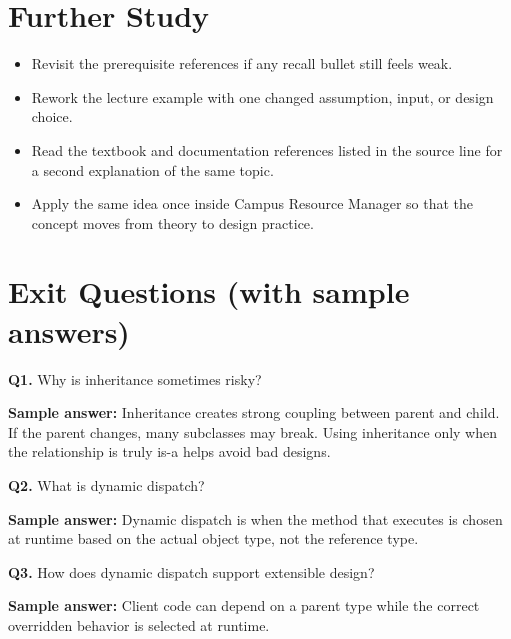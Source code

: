 \documentclass[11pt]{article}
\begin{document}
\section{Further Study}
\begin{itemize}
  \item Revisit the prerequisite references if any recall bullet still feels weak.
  \item Rework the lecture example with one changed assumption, input, or design choice.
  \item Read the textbook and documentation references listed in the source line for a second explanation of the same topic.
  \item Apply the same idea once inside Campus Resource Manager so that the concept moves from theory to design practice.
\end{itemize}
\notesources{\OOPSUnitIISources}

\section{Exit Questions (with sample answers)}
\textbf{Q1.} Why is inheritance sometimes risky?\par
\textbf{Sample answer:} Inheritance creates strong coupling between parent and child. If the parent changes, many subclasses may break. Using inheritance only when the relationship is truly is-a helps avoid bad designs.

\vspace{0.6em}
\textbf{Q2.} What is dynamic dispatch?\par
\textbf{Sample answer:} Dynamic dispatch is when the method that executes is chosen at runtime based on the actual object type, not the reference type.

\vspace{0.6em}
\textbf{Q3.} How does dynamic dispatch support extensible design?\par
\textbf{Sample answer:} Client code can depend on a parent type while the correct overridden behavior is selected at runtime.
\end{document}

